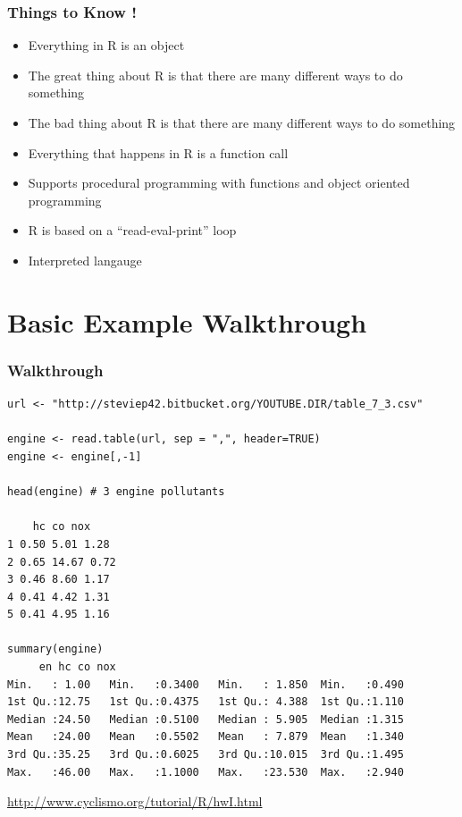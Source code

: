 \documentclass{beamer}
\begin{document}
\begin{frame}[fragile]
\frametitle{Things to Know !}
\begin{itemize}
\item Everything in R is an object
\item The great thing about R is that there are many different ways to do something
\item The bad thing about R is that there are many different ways to do something
\item Everything that happens in R is a function call
\item Supports procedural programming with functions and object oriented programming 
\item R is based on a ``read-eval-print'' loop
\item Interpreted langauge
\end{itemize}

\end{frame}

\section{Basic Example Walkthrough}

\begin{frame}[fragile]
\frametitle{Walkthrough}
\scriptsize
\begin{verbatim}
url <- "http://steviep42.bitbucket.org/YOUTUBE.DIR/table_7_3.csv"

engine <- read.table(url, sep = ",", header=TRUE)
engine <- engine[,-1]

head(engine) # 3 engine pollutants

    hc co nox
1 0.50 5.01 1.28
2 0.65 14.67 0.72
3 0.46 8.60 1.17
4 0.41 4.42 1.31
5 0.41 4.95 1.16

summary(engine)
     en hc co nox
Min.   : 1.00   Min.   :0.3400   Min.   : 1.850  Min.   :0.490
1st Qu.:12.75   1st Qu.:0.4375   1st Qu.: 4.388  1st Qu.:1.110
Median :24.50   Median :0.5100   Median : 5.905  Median :1.315
Mean   :24.00   Mean   :0.5502   Mean   : 7.879  Mean   :1.340
3rd Qu.:35.25   3rd Qu.:0.6025   3rd Qu.:10.015  3rd Qu.:1.495
Max.   :46.00   Max.   :1.1000   Max.   :23.530  Max.   :2.940
\end{verbatim}
\scriptsize
\url{http://www.cyclismo.org/tutorial/R/hwI.html}

\end{frame}


\end{document}
